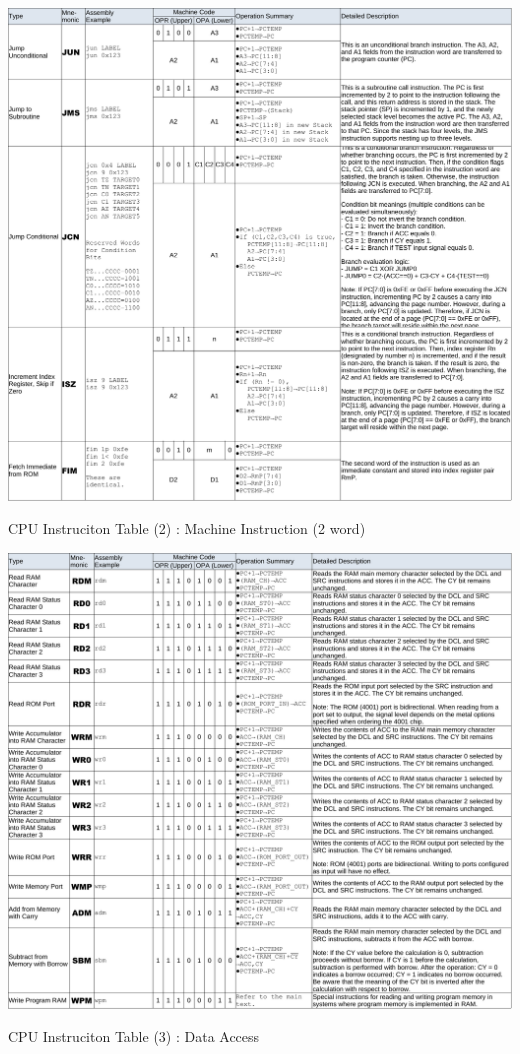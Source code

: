 \begin{table}[htbp]
    \includegraphics[width=1.00\columnwidth]{./Table/ISA(2)Machine(2word).pdf}
    \caption{CPU Instruciton Table (2) : Machine Instruction (2 word)}
    \label{tb:ISA2MACHINE2WORD}
\end{table}
\begin{table}[htbp]
    \includegraphics[width=1.00\columnwidth]{./Table/ISA(3)DataAccess.pdf}
    \caption{CPU Instruciton Table (3) : Data Access}
    \label{tb:ISA3DATAACCESS}
\end{table}

